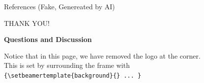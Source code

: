 \documentclass[12pt, aspectratio=169]{beamer}
\begin{document}
\begin{frame}[allowframebreaks]{References (Fake, Genereated by AI)}
\nocite{*}

\end{frame}



{
\begin{frame}

\centering
{\serif{}\fontsize{40}{48}\selectfont\color{SMUBlue!95!black} THANK YOU!}
\vskip11pt\par
{\Huge \bf \serif\color{SMUBlue!95!black}Questions and Discussion}

{Notice that in this page, we have removed the logo at the corner. \\This is set by surrounding the frame with \\ \texttt{\{\textbackslash{}setbeamertemplate\{background\}\{\} ... \}}} \\
\end{frame}}
\end{document}

